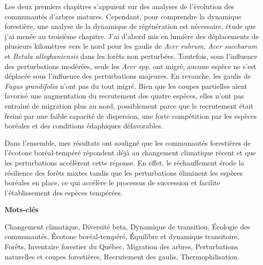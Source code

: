 Les deux premiers chapitres s'appuient sur des analyses de l'évolution
des communautés d'arbres matures. Cependant, pour comprendre la
dynamique forestière, une analyse de la dynamique de régénération est
nécessaire, étude que j'ai menée au troisième chapitre. J'ai d'abord mis
en lumière des déplacements de plusieurs kilomètres vers le nord pour
les gaulis de \emph{Acer rubrum}, \emph{Acer saccharum} et \emph{Betula
alleghaniensis} dans les forêts non perturbées. Toutefois, sous
l'influence des perturbations modérées, seuls les \emph{Acer spp.} ont
migré; aucune espèce ne s'est déplacée sous l'influence des
perturbations majeures. En revanche, les gaulis de \emph{Fagus
grandifolia} n'ont pas du tout migré. Bien que les coupes partielles
aient favorisé une augmentation du recrutement des quatre espèces, elles
n'ont pas entraîné de migration plus au nord, possiblement parce que le
recrutement était freiné par une faible capacité de dispersion, une
forte compétition par les espèces boréales et des conditions édaphiques
défavorables.

Dans l'ensemble, mes résultats ont souligné que les communautés
forestières de l'écotone boréal-tempéré répondent déjà au changement
climatique récent et que les perturbations accélèrent cette réponse. En
effet, le réchauffement érode la résilience des forêts mixtes tandis que
les perturbations éliminent les espèces boréales en place, ce qui
accélère le processus de succession et facilite l'établissement des
espèces tempérées.

\vspace{1cm}

\textbf{Mots-clés}

Changement climatique, Diversité beta, Dynamique de transition, Écologie
des communautés, Écotone boréal-tempéré, Équilibre et dynamique
transitoire, Forêts, Inventaire forestier du Québec, Migration des
arbres, Perturbations naturelles et coupes forestières, Recrutement des
gaulis, Thermophilisation.
